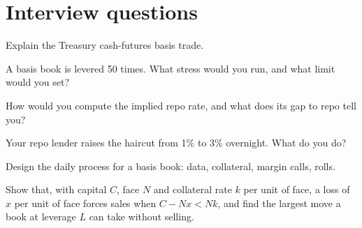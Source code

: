 \section{Interview questions}

\begin{interviewq}\label{iq:s2:the-bond-futures-basis-trade:1}
Explain the Treasury cash-futures basis trade.
\end{interviewq}

\begin{interviewq}\label{iq:s2:the-bond-futures-basis-trade:2}
A basis book is levered 50 times. What stress would you run, and what limit would you set?
\end{interviewq}

\begin{interviewq}\label{iq:s2:the-bond-futures-basis-trade:3}
How would you compute the implied repo rate, and what does its gap to repo tell you?
\end{interviewq}

\begin{interviewq}\label{iq:s2:the-bond-futures-basis-trade:4}
Your repo lender raises the haircut from 1\% to 3\% overnight. What do you do?
\end{interviewq}

\begin{interviewq}\label{iq:s2:the-bond-futures-basis-trade:5}
Design the daily process for a basis book: data, collateral, margin calls, rolls.
\end{interviewq}

\begin{interviewq}\label{iq:s2:the-bond-futures-basis-trade:6}
Show that, with capital $C$, face $N$ and collateral rate $k$ per unit of face, a loss of $x$ per unit of face forces sales when $C - Nx < Nk$, and find
the largest move a book at leverage $L$ can take without selling.
\end{interviewq}
